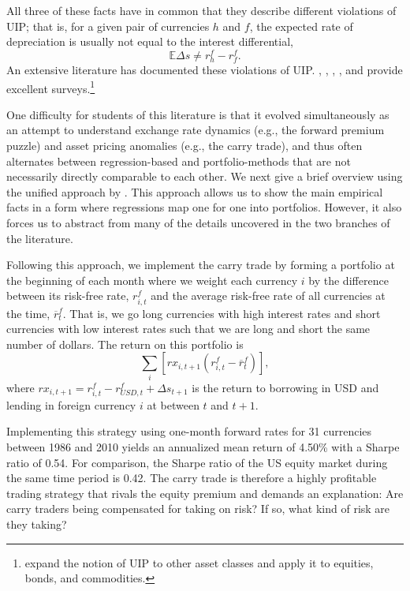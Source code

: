 \documentclass{ar-1col}
\begin{document}
All three of these facts have in common that they describe different violations of UIP; that is, for a given pair of currencies $h$ and $f$, the expected rate of depreciation is usually not equal to the interest differential, $$\mathbb{E}\Delta s \neq r^f_h-r^f_f .$$ An extensive literature has documented these violations of UIP. \citet{Hodrick1987}, \citet{FrootThaler1990}, \citet{Engel1996}, \citet{Lewis2011}, and \citet{Engel2014} provide excellent surveys.\footnote{\cite{koijen2018carry} expand the notion of UIP to other asset classes and apply it to equities, bonds, and commodities.}

One difficulty for students of this literature is that it evolved simultaneously as an attempt to understand exchange rate dynamics (e.g., the forward premium puzzle) and asset pricing anomalies (e.g., the carry trade), and thus often alternates between regression-based and portfolio-methods that are not necessarily directly comparable to each other. We next give a brief overview using the unified approach by \citet{HassanMano2019}. This approach allows us to show the main empirical facts in a form where regressions map one for one into portfolios. However, it also forces us to abstract from many of the details uncovered in the two branches of the literature.

Following this approach, we implement the carry trade by forming a portfolio at the beginning of each month where we weight each currency $i$ by the difference between its risk-free rate, $r^f_{i, t}$ and the average risk-free rate of all currencies at the time, $\overline{r}^f_t$. That is, we go long currencies with high interest rates and short currencies with low interest rates such that we are long and short the same number of dollars. The return on this portfolio is
\begin{equation}
  \label{eq_carry}
  \textstyle\sum_{i}\left[ rx_{i, t+1}\left( r^f_{i, t}-\overline{r}^f_{t}\right) \right] ,
\end{equation}%
where $rx_{i, t+1} = r^f_{i, t} - r^f_{USD, t} + \Delta s_{t + 1}$ is the return to borrowing in USD and lending in foreign currency $i$ at between $t$ and $t+1$.

Implementing this strategy using one-month forward rates for 31 currencies between 1986 and 2010 yields an annualized mean return of 4.50\% with a Sharpe ratio of 0.54. For comparison, the Sharpe ratio of the US equity market during the same time period is 0.42. The carry trade is therefore a highly profitable trading strategy that rivals the equity premium and demands an explanation: Are carry traders being compensated for taking on risk? If so, what kind of risk are they taking?
\end{document}
